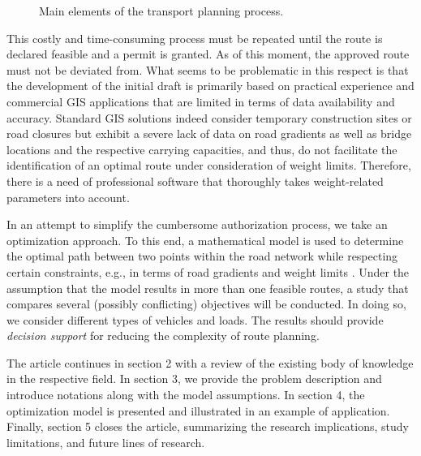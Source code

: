 \begin{figure}[!ht]
  \centering

  \caption{Main elements of the \ohc transport planning process.}
  \label{fig:higherlevel2}
\end{figure}

This costly and time-consuming process must be repeated until the route is declared feasible and a permit is granted. As of this moment, the approved route must not be deviated from.
What seems to be problematic in this respect is that the development of the initial draft is primarily based on practical experience and commercial GIS applications that are limited in terms of data availability and accuracy.
Standard GIS solutions indeed consider temporary construction sites or road closures but exhibit a severe lack of data on road gradients as well as bridge locations and the respective carrying capacities, and thus, do not facilitate the identification of an optimal route under consideration of weight limits.
Therefore, there is a need of professional software that thoroughly takes weight-related parameters into account.
\par In an attempt to simplify the cumbersome authorization process, we take an optimization approach.
To this end, a mathematical model is used to determine the optimal path between two points within the road network while respecting certain constraints, e.g., in terms of road gradients and weight limits \cite{liedtke2012generation, zhu2014vehicle}.
Under the assumption that the model results in more than one feasible routes, a study that compares several (possibly conflicting) objectives will be conducted.
In doing so, we consider different types of vehicles and loads. The results should provide \textit{decision support} for reducing the complexity of \ohc route planning.
\par
The article continues in section 2 with a review of the existing body of knowledge in the respective field.
In section 3, we provide the problem description and introduce notations along with the model assumptions. In section 4, the optimization model is presented and illustrated in an example of application.
Finally, section 5 closes the article, summarizing the research implications, study limitations, and future lines of research.
